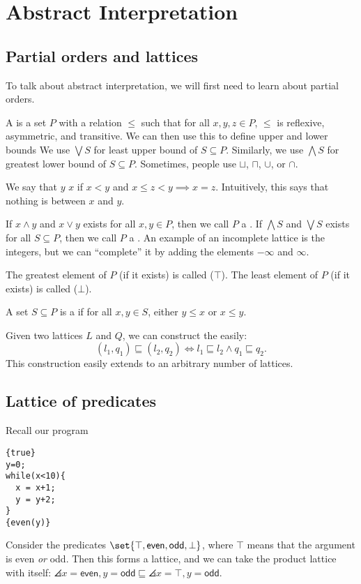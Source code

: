 \documentclass[class=scrartcl]{standalone}
\begin{document}
\section{Abstract Interpretation}
\subsection{Partial orders and lattices}
To talk about abstract interpretation,
we will first need to learn about partial orders.

A  is a set \(P\) with a relation \(\leq\)
such that for all \(x, y, z \in P\),
\(\leq\) is reflexive, asymmetric, and transitive.
We can then use this to define upper and lower bounds
We use \(\bigvee S\) for least upper bound of \(S \subseteq P\).
Similarly, we use \(\bigwedge S\) for greatest lower bound of \(S \subseteq P\).
Sometimes, people use \(\sqcup\), \(\sqcap\), \(\cup\), or \(\cap\).

We say that \(y\)  \(x\) if \(x < y\) and
\(x \leq z < y \implies x = z\).
Intuitively, this says that nothing is between \(x\) and \(y\).

If \(x \wedge y\) and \(x \vee y\) exists for all \(x, y \in P\),
then we call \(P\) a .
If \(\bigwedge S\) and \(\bigvee S\) exists for all \(S \subseteq P\),
then we call \(P\) a .
An example of an incomplete lattice is the integers,
but we can ``complete'' it by adding the elements \(- \infty\) and \(\infty\).

The greatest element of \(P\) (if it exists) is called  (\(\top\)).
The least element of \(P\) (if it exists) is called  (\(\bot\)).

A set \(S \subseteq P\) is a  if for all \(x, y \in S\),
either \(y \leq x\) or \(x \leq y\).

Given two lattices \(L\) and \(Q\),
we can construct the  easily:
\[
  (l_1, q_1) \sqsubseteq (l_2, q_2) \iff
    l_1 \sqsubseteq l_2 \land q_1 \sqsubseteq q_2.
\]
This construction easily extends to an arbitrary number of lattices.

\subsection{Lattice of predicates}
Recall our program
\begin{verbatim}
{true}
y=0;
while(x<10){
  x = x+1;
  y = y+2;
}
{even(y)}
\end{verbatim}
Consider the predicates \(\set{\top, \textsf{even}, \textsf{odd}, \bot}\),
where \(\top\) means that the argument is even \emph{or} odd.
Then this forms a lattice, and we can take the product lattice with itself:
\(\angles{x = \textsf{even}, y = \textsf{odd}} \sqsubseteq
    \angles{x = \top, y = \textsf{odd}}\).
\end{document}
